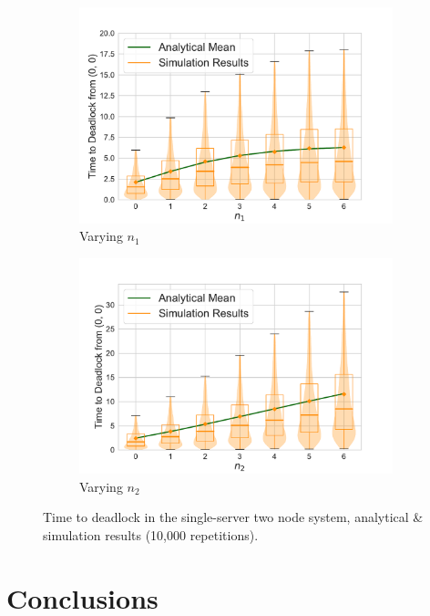 \documentclass{article}
\numberwithin{equation}{section}
\begin{document}
\begin{figure}[!htbp]
\begin{center}
\begin{subfigure}[b]{0.48\textwidth}
  \includegraphics[width=\textwidth]{images/2Nmsfb_varyn1}
  \caption{Varying $n_1$}
  \label{fig:timestodeadlockfb_n1}
\end{subfigure}
\begin{subfigure}[b]{0.48\textwidth}
  \includegraphics[width=\textwidth]{images/2Nmsfb_varyn2}
  \caption{Varying $n_2$}
  \label{fig:timestodeadlockfb_n2}
\end{subfigure}
\end{center}
\caption{Time to deadlock in the single-server two node system, analytical \&
simulation results (10,000 repetitions).}
\label{fig:timestodeadlockfeedback}
\end{figure}



\section{Conclusions}\label{sec:conclusions}
\end{document}
